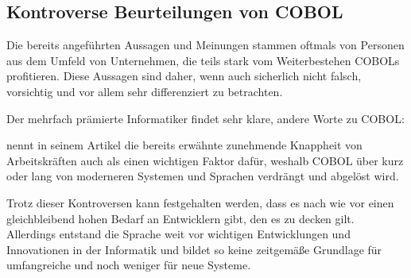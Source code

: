 \subsection*{Kontroverse Beurteilungen von COBOL}
Die bereits angeführten Aussagen und Meinungen stammen oftmals von Personen aus dem Umfeld von Unternehmen, die teils stark vom Weiterbestehen COBOLs profitieren. Diese Aussagen sind daher, wenn auch sicherlich nicht falsch, vorsichtig und vor allem sehr differenziert zu betrachten.

Der mehrfach prämierte Informatiker \citeauthor{edsger_wybe_dijkstra_how_1975} \zB findet sehr klare, andere Worte zu COBOL:  \cite{edsger_wybe_dijkstra_how_1975}

\citeauthor{florian_hamann_banken_2017} nennt in seinem Artikel  die bereits erwähnte zunehmende Knappheit von Arbeitskräften auch als einen wichtigen Faktor dafür, weshalb COBOL über kurz oder lang von moderneren Systemen und Sprachen verdrängt und abgelöst wird.

Trotz dieser Kontroversen kann festgehalten werden, dass es nach wie vor einen gleichbleibend hohen Bedarf an Entwicklern gibt, den es zu decken gilt. Allerdings entstand die Sprache weit vor wichtigen Entwicklungen und Innovationen in der Informatik und bildet so keine zeitgemäße Grundlage für umfangreiche und noch weniger für neue Systeme.